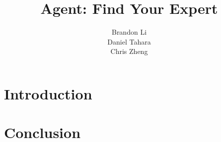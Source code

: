 \setlength{\topmargin}{-.5in}
\setlength{\textheight}{9in}
\setlength{\oddsidemargin}{.125in}
\setlength{\textwidth}{6in}

\usepackage{algorithm}
\usepackage{algpseudocode}
\usepackage{color}

\newcommand{\textred}[1]{\textcolor{red}{#1}}
\ifx\noeditingmarks\undefined
  \newcommand{\pgwrapper}[2]{\textbf{#1: }\textred{#2}}
\else
  \newcommand{\pgwrapper}[2]{}
\fi
\newcommand\todo[1]{\textcolor{red}{#1}}
\newcommand\RED[1]{\textcolor{red}{#1}}
\newcommand\BLUE[1]{\textcolor{blue}{#1}}
\newcommand\GREEN[1]{\textcolor{brown}{#1}}
\newcommand{\para}[1]{\smallskip\noindent {\bf #1}}



\title{Agent: Find Your Expert}
\author{
  \alignauthor
  Brandon Li \\
  Daniel Tahara \\
  Chris Zheng
  \\
}
\renewcommand{\today}{}
\maketitle

\section{Introduction}
\label{sec:intro}



\section{Conclusion}
\label{sec:conclusion}






